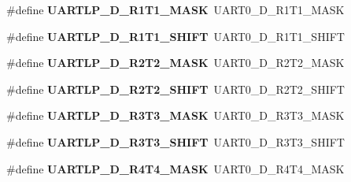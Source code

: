 \begin{DoxyCompactItemize}
\item 
\hypertarget{group___backward___compatibility___symbols_ga5ee9734a722b015b5cf6a8f0f242445b}{}\#define {\bfseries U\+A\+R\+T\+L\+P\+\_\+\+D\+\_\+\+R1\+T1\+\_\+\+M\+A\+S\+K}~U\+A\+R\+T0\+\_\+\+D\+\_\+\+R1\+T1\+\_\+\+M\+A\+S\+K\label{group___backward___compatibility___symbols_ga5ee9734a722b015b5cf6a8f0f242445b}

\item 
\hypertarget{group___backward___compatibility___symbols_ga9ae77e2a0f335113ae450295a927aafe}{}\#define {\bfseries U\+A\+R\+T\+L\+P\+\_\+\+D\+\_\+\+R1\+T1\+\_\+\+S\+H\+I\+F\+T}~U\+A\+R\+T0\+\_\+\+D\+\_\+\+R1\+T1\+\_\+\+S\+H\+I\+F\+T\label{group___backward___compatibility___symbols_ga9ae77e2a0f335113ae450295a927aafe}

\item 
\hypertarget{group___backward___compatibility___symbols_ga5e511688ca9d65b6f298ecf4c9983f92}{}\#define {\bfseries U\+A\+R\+T\+L\+P\+\_\+\+D\+\_\+\+R2\+T2\+\_\+\+M\+A\+S\+K}~U\+A\+R\+T0\+\_\+\+D\+\_\+\+R2\+T2\+\_\+\+M\+A\+S\+K\label{group___backward___compatibility___symbols_ga5e511688ca9d65b6f298ecf4c9983f92}

\item 
\hypertarget{group___backward___compatibility___symbols_ga9c26b19d89d75331664cd34366569eaa}{}\#define {\bfseries U\+A\+R\+T\+L\+P\+\_\+\+D\+\_\+\+R2\+T2\+\_\+\+S\+H\+I\+F\+T}~U\+A\+R\+T0\+\_\+\+D\+\_\+\+R2\+T2\+\_\+\+S\+H\+I\+F\+T\label{group___backward___compatibility___symbols_ga9c26b19d89d75331664cd34366569eaa}

\item 
\hypertarget{group___backward___compatibility___symbols_ga147acf9d25c9aed961994759b4a09adf}{}\#define {\bfseries U\+A\+R\+T\+L\+P\+\_\+\+D\+\_\+\+R3\+T3\+\_\+\+M\+A\+S\+K}~U\+A\+R\+T0\+\_\+\+D\+\_\+\+R3\+T3\+\_\+\+M\+A\+S\+K\label{group___backward___compatibility___symbols_ga147acf9d25c9aed961994759b4a09adf}

\item 
\hypertarget{group___backward___compatibility___symbols_ga71795a0a7638b19ce28c042efd756c10}{}\#define {\bfseries U\+A\+R\+T\+L\+P\+\_\+\+D\+\_\+\+R3\+T3\+\_\+\+S\+H\+I\+F\+T}~U\+A\+R\+T0\+\_\+\+D\+\_\+\+R3\+T3\+\_\+\+S\+H\+I\+F\+T\label{group___backward___compatibility___symbols_ga71795a0a7638b19ce28c042efd756c10}

\item 
\hypertarget{group___backward___compatibility___symbols_ga4c58c78e1a9349104a0d2e4fb70fd84c}{}\#define {\bfseries U\+A\+R\+T\+L\+P\+\_\+\+D\+\_\+\+R4\+T4\+\_\+\+M\+A\+S\+K}~U\+A\+R\+T0\+\_\+\+D\+\_\+\+R4\+T4\+\_\+\+M\+A\+S\+K\label{group___backward___compatibility___symbols_ga4c58c78e1a9349104a0d2e4fb70fd84c}


\end{DoxyCompactItemize}
